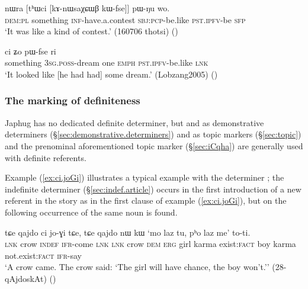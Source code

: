  \begin{exe}
\ex \label{ex:thWci.kAnWsaXCWB}
\gll nɯra [tʰɯci [kɤ-nɯsaχɕɯβ kɯ-fse]] pɯ-ŋu wo.  \\
\textsc{dem}:\textsc{pl} something \textsc{inf}-have.a.contest \textsc{sbj}:\textsc{pcp}-be.like \textsc{pst}.\textsc{ipfv}-be \textsc{sfp} \\
\glt `It was like a kind of contest.' (160706 thotsi)
()
 \end{exe}
 
\begin{exe}
\ex \label{ex:thWci.WjmNo}
 ci ʑo pɯ-fse ri \\
something \textsc{3sg}.\textsc{poss}-dream one \textsc{emph} \textsc{pst}.\textsc{ipfv}-be.like \textsc{lnk} \\
\glt `It looked like [he had had] some dream.' (Lobzang2005)
()
 \end{exe}
 
 
\subsubsection{The marking of definiteness} \label{sec:definiteness}
Japhug has no dedicated definite determiner, but   and   as demonstrative determiners (§\ref{sec:demonstrative.determiners}) and as topic markers (§\ref{sec:topic}) and the prenominal aforementioned topic marker  (§\ref{sec:iCqha}) are generally used with definite referents.  

Example (\ref{ex:ci.joGi}) illustrates a typical example with the determiner ; the indefinite determiner  (§\ref{sec:indef.article}) occurs in the first introduction of a new referent in the story as in the first clause of example (\ref{ex:ci.joGi}), but on the following occurrence of the same noun  is found.

\begin{exe}
\ex \label{ex:ci.joGi}
 \gll  tɕe qajdo ci jo-ɣi tɕe, tɕe qajdo nɯ kɯ `mo laz tu, pʰo laz me' to-ti. \\
 \textsc{lnk} crow \textsc{indef} \textsc{ifr}-come \textsc{lnk} \textsc{lnk} crow \textsc{dem} \textsc{erg} girl karma exist:\textsc{fact} boy karma not.exist:\textsc{fact} \textsc{ifr}-say \\
 \glt `A crow came. The crow said: `The girl will have  chance, the boy won't.'' (28-qAjdoskAt) ()
\end{exe}

